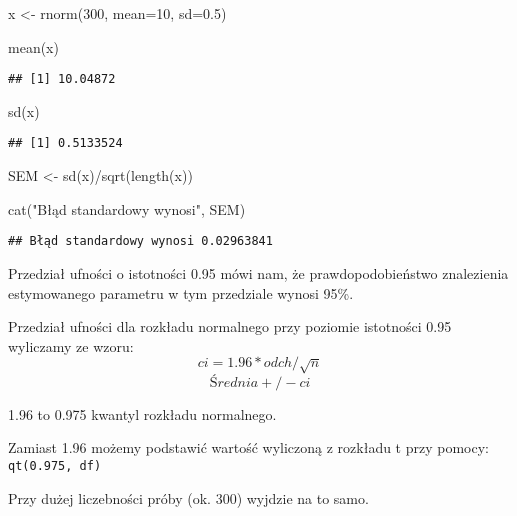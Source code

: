 \documentclass[
]{book}
\newenvironment{Shaded}{\begin{snugshade}}{\end{snugshade}}
\newcommand{\AttributeTok}[1]{\textcolor[rgb]{0.77,0.63,0.00}{#1}}
\newcommand{\DecValTok}[1]{\textcolor[rgb]{0.00,0.00,0.81}{#1}}
\newcommand{\FloatTok}[1]{\textcolor[rgb]{0.00,0.00,0.81}{#1}}
\newcommand{\FunctionTok}[1]{\textcolor[rgb]{0.00,0.00,0.00}{#1}}
\newcommand{\NormalTok}[1]{#1}
\newcommand{\OtherTok}[1]{\textcolor[rgb]{0.56,0.35,0.01}{#1}}
\newcommand{\SpecialCharTok}[1]{\textcolor[rgb]{0.00,0.00,0.00}{#1}}
\newcommand{\StringTok}[1]{\textcolor[rgb]{0.31,0.60,0.02}{#1}}
\begin{document}
\begin{Shaded}
\begin{Highlighting}[]
\NormalTok{x }\OtherTok{\textless{}{-}} \FunctionTok{rnorm}\NormalTok{(}\DecValTok{300}\NormalTok{, }\AttributeTok{mean=}\DecValTok{10}\NormalTok{, }\AttributeTok{sd=}\FloatTok{0.5}\NormalTok{)}

\FunctionTok{mean}\NormalTok{(x)}
\end{Highlighting}
\end{Shaded}

\begin{verbatim}
## [1] 10.04872
\end{verbatim}

\begin{Shaded}
\begin{Highlighting}[]
\FunctionTok{sd}\NormalTok{(x)}
\end{Highlighting}
\end{Shaded}

\begin{verbatim}
## [1] 0.5133524
\end{verbatim}

\begin{Shaded}
\begin{Highlighting}[]
\NormalTok{SEM }\OtherTok{\textless{}{-}} \FunctionTok{sd}\NormalTok{(x)}\SpecialCharTok{/}\FunctionTok{sqrt}\NormalTok{(}\FunctionTok{length}\NormalTok{(x))}

\FunctionTok{cat}\NormalTok{(}\StringTok{"Błąd standardowy wynosi"}\NormalTok{, SEM)}
\end{Highlighting}
\end{Shaded}

\begin{verbatim}
## Błąd standardowy wynosi 0.02963841
\end{verbatim}

Przedział ufności o istotności 0.95 mówi nam, że prawdopodobieństwo znalezienia estymowanego parametru w tym przedziale wynosi 95\%.

Przedział ufności dla rozkładu normalnego przy poziomie istotności 0.95 wyliczamy ze wzoru:
\[ci= 1.96*odch/\sqrt{n}\]
\[Średnia +/- ci\]

1.96 to 0.975 kwantyl rozkładu normalnego.

Zamiast 1.96 możemy podstawić wartość wyliczoną z rozkładu t przy pomocy: \texttt{qt(0.975,\ df)}

Przy dużej liczebności próby (ok. 300) wyjdzie na to samo.
\end{document}
